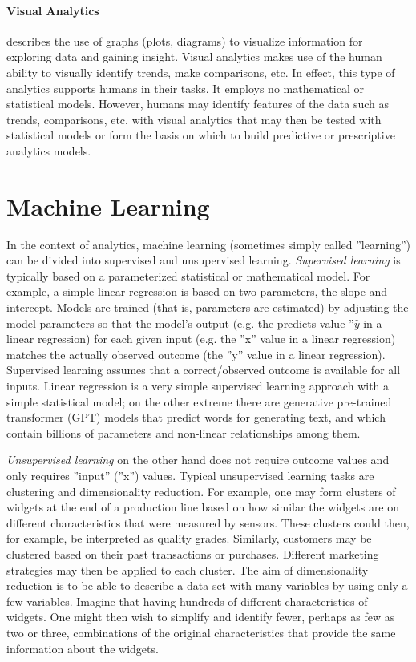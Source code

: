 \paragraph*{Visual Analytics} describes the use of graphs (plots, diagrams) to visualize information for exploring data and gaining insight. Visual analytics makes use of the human ability to visually identify trends, make comparisons, etc. In effect, this type of analytics supports humans in their tasks. It employs no mathematical or statistical models. However, humans may identify features of the data such as trends, comparisons, etc. with visual analytics that may then be tested with statistical models or form the basis on which to build predictive or prescriptive analytics models. 

\section{Machine Learning}

In the context of analytics, machine learning (sometimes simply called ''learning'') can be divided into supervised and unsupervised learning. \emph{Supervised learning} is typically based on a parameterized statistical or mathematical model. For example, a simple linear regression is based on two parameters, the slope and intercept. Models are trained (that is, parameters are estimated) by adjusting the model parameters so that the model's output (e.g. the predicts value ''$\hat{y}$ in a linear regression) for each given input (e.g. the ''x'' value in a linear regression) matches the actually observed outcome (the ''y'' value in a linear regression). Supervised learning assumes that a correct/observed outcome is available for all inputs. Linear regression is a very simple supervised learning approach with a simple statistical model; on the other extreme there are generative pre-trained transformer (GPT) models that predict words for generating text, and which contain billions of parameters and non-linear relationships among them.

\emph{Unsupervised learning} on the other hand does not require outcome values and only requires ''input'' (''x'') values. Typical unsupervised learning tasks are clustering and dimensionality reduction. For example, one may form clusters of widgets at the end of a production line based on how similar the widgets are on different characteristics that were measured by sensors. These clusters could then, for example, be interpreted as quality grades. Similarly, customers may be clustered based on their past transactions or purchases. Different marketing strategies may then be applied to each cluster. The aim of dimensionality reduction is to be able to describe a data set with many variables by using only a few variables. Imagine that having hundreds of different characteristics of widgets. One might then wish to simplify and identify fewer, perhaps as few as two or three, combinations of the original characteristics that provide the same information about the widgets.


